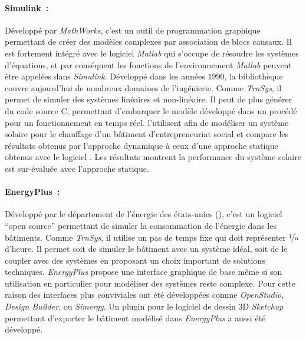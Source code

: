 \paragraph{Simulink~:} %
\label{par:simulink}
Développé par \textit{MathWorks}, c’est un outil de programmation graphique permettant de
créer des modèles complexes par association de blocs causaux. Il est fortement intégré
avec le logiciel \textit{Matlab} qui s’occupe de résoudre les systèmes d’équations, et par
conséquent les fonctions de l’environnement \textit{Matlab} peuvent être appelées dans
\textit{Simulink}. Développé dans les années $1990$, la bibliothèque couvre
aujourd’hui de nombreux domaines de l’ingénierie. Comme \textit{TrnSys}, il permet de
simuler des systèmes linéaires et non-linéaire. Il peut de plus générer du code source C,
permettant d’embarquer le modèle développé dans un procédé pour un fonctionnement en temps
réel. \textcite{Mosallat2013686} l’utilisent afin de modéliser un système solaire pour le
chauffage d’un bâtiment d’entrepreneuriat social et compare les résultats obtenus par
l’approche dynamique à ceux d’une approche statique obtenus avec le logiciel
. Les résultats montrent la performance
du système solaire est sur-évaluée avec l’approche statique.

\paragraph{EnergyPlus~:} %
\label{par:energyplus}
Développé par le département de l’énergie des états-unies (), c’est un logiciel
\enquote{open source} permettant de simuler la consommation de l’énergie dans les
bâtiments. Comme \textit{TrnSys}, il utilise un pas de temps fixe qui doit représenter
$\nicefrac{1}{n}$ d’heure. Il permet soit de simuler le bâtiment avec un système
idéal, soit de le coupler avec des systèmes en proposant un choix important de solutions
techniques. \textit{EnergyPlus} propose une interface graphique de base même si son
utilisation en particulier pour modéliser des systèmes reste complexe. Pour cette raison
des interfaces plus conviviales ont été développées comme \textit{OpenStudio},
\textit{Design Builder}, ou \textit{Simergy}. Un plugin pour le
logiciel de dessin $3$D \textit{Sketchup} permettant d’exporter le bâtiment modélisé dans
\textit{EnergyPlus} a aussi été développé.

